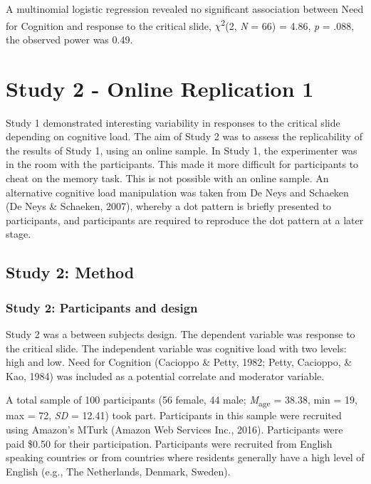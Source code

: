 \documentclass[
  american,
  man,floatsintext]{apa7}
\begin{document}
A multinomial logistic regression revealed no significant association between Need for Cognition and response to the critical slide, \(\chi\)\textsuperscript{2}(2, \emph{N} = 66) = 4.86, \emph{p} = .088, the observed power was 0.49.

\hypertarget{study-2---online-replication-1}{%
\section{Study 2 - Online Replication 1}\label{study-2---online-replication-1}}

Study 1 demonstrated interesting variability in responses to the critical slide depending on cognitive load. The aim of Study 2 was to assess the replicability of the results of Study 1, using an online sample. In Study 1, the experimenter was in the room with the participants. This made it more difficult for participants to cheat on the memory task. This is not possible with an online sample. An alternative cognitive load manipulation was taken from De Neys and Schaeken (De Neys \& Schaeken, 2007), whereby a dot pattern is briefly presented to participants, and participants are required to reproduce the dot pattern at a later stage.

\hypertarget{study-2-method}{%
\subsection{Study 2: Method}\label{study-2-method}}

\hypertarget{study-2-participants-and-design}{%
\subsubsection{Study 2: Participants and design}\label{study-2-participants-and-design}}

Study 2 was a between subjects design. The dependent variable was response to the critical slide. The independent variable was cognitive load with two levels: high and low. Need for Cognition (Cacioppo \& Petty, 1982; Petty, Cacioppo, \& Kao, 1984) was included as a potential correlate and moderator variable.

A total sample of 100 participants (56 female, 44 male; \emph{M}\textsubscript{age} = 38.38, min = 19, max = 72, \emph{SD} = 12.41) took part. Participants in this sample were recruited using Amazon's MTurk (Amazon Web Services Inc., 2016). Participants were paid \$0.50 for their participation. Participants were recruited from English speaking countries or from countries where residents generally have a high level of English (e.g., The Netherlands, Denmark, Sweden).
\end{document}
